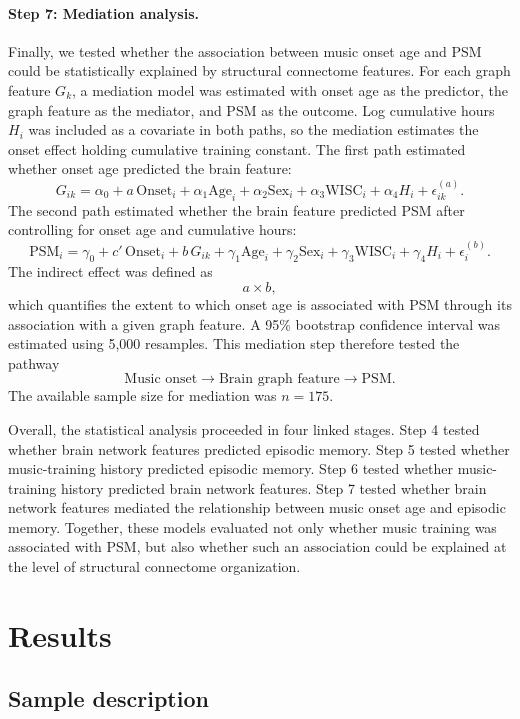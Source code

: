\documentclass[11pt]{article}
\begin{document}
\paragraph{Step 7: Mediation analysis.}
Finally, we tested whether the association between music onset age and PSM could be statistically explained by structural connectome features. For each graph feature $G_k$, a mediation model was estimated with onset age as the predictor, the graph feature as the mediator, and PSM as the outcome. Log cumulative hours $H_i$ was included as a covariate in both paths, so the mediation estimates the onset effect holding cumulative training constant. The first path estimated whether onset age predicted the brain feature:
\[
G_{ik}
=
\alpha_0
+
a\,\mathrm{Onset}_i
+
\alpha_1 \mathrm{Age}_i
+
\alpha_2 \mathrm{Sex}_i
+
\alpha_3 \mathrm{WISC}_i
+
\alpha_4 H_i
+
\epsilon_{ik}^{(a)}.
\]
The second path estimated whether the brain feature predicted PSM after controlling for onset age and cumulative hours:
\[
\mathrm{PSM}_i
=
\gamma_0
+
c'\,\mathrm{Onset}_i
+
b\,G_{ik}
+
\gamma_1 \mathrm{Age}_i
+
\gamma_2 \mathrm{Sex}_i
+
\gamma_3 \mathrm{WISC}_i
+
\gamma_4 H_i
+
\epsilon_i^{(b)}.
\]
The indirect effect was defined as
\[
a \times b,
\]
which quantifies the extent to which onset age is associated with PSM through its association with a given graph feature. A 95\% bootstrap confidence interval was estimated using 5,000 resamples. This mediation step therefore tested the pathway
\[
\text{Music onset}
\rightarrow
\text{Brain graph feature}
\rightarrow
\text{PSM}.
\]
The available sample size for mediation was $n=175$.

Overall, the statistical analysis proceeded in four linked stages. Step 4 tested whether brain network features predicted episodic memory. Step 5 tested whether music-training history predicted episodic memory. Step 6 tested whether music-training history predicted brain network features. Step 7 tested whether brain network features mediated the relationship between music onset age and episodic memory. Together, these models evaluated not only whether music training was associated with PSM, but also whether such an association could be explained at the level of structural connectome organization.


\section{Results}

\subsection{Sample description}
\end{document}
